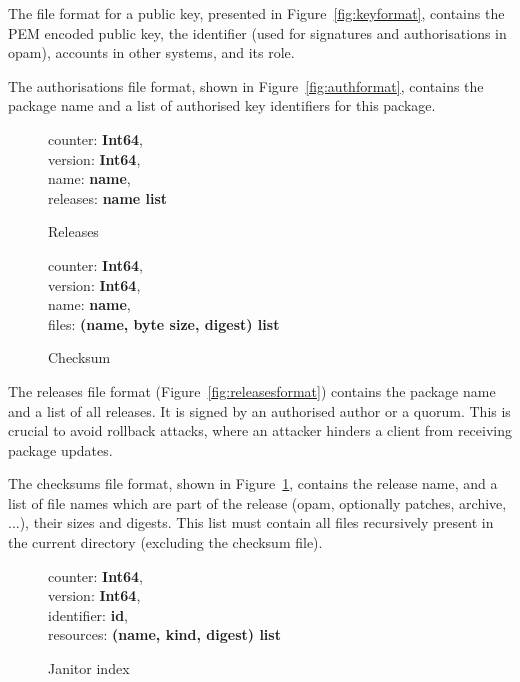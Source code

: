 \documentclass[nocopyrightspace]{sigplanconf}
\begin{document}
The file format for a public key, presented in Figure~\ref{fig:keyformat}, contains the PEM encoded public key, the identifier (used for signatures and authorisations in opam), accounts in other systems, and its role.

The authorisations file format, shown in Figure~\ref{fig:authformat}, contains the package name and a list of authorised key identifiers for this package.

\begin{figure}[h]
  \begin{minipage}{\hsize}
    \begin{minipage}{.3 \hsize}
counter: \textbf{Int64},\\
version: \textbf{Int64},\\
name: \textbf{name},\\
releases: \textbf{name list}
 \caption{\label{fig:releasesformat} Releases}
    \end{minipage}
    \hspace*{.5cm}
    \begin{minipage}{.55 \hsize}
counter: \textbf{Int64},\\
version: \textbf{Int64},\\
name: \textbf{name},\\
files: \textbf{(name, byte size, digest) list}
 \caption{\label{fig:checksumformat} Checksum}
    \end{minipage}
  \end{minipage}
\end{figure}

The releases file format (Figure~\ref{fig:releasesformat}) contains the package name and a list of all releases.
It is signed by an authorised author or a quorum.
This is crucial to avoid rollback attacks, where an attacker hinders a client from receiving package updates.

The checksums file format, shown in Figure~\ref{fig:checksumformat}, contains the release name, and a list of file names which are part of the release (opam, optionally patches, archive, ...), their sizes and digests.
This list must contain all files recursively present in the current directory (excluding the checksum file).

\begin{figure}[h]
counter: \textbf{Int64},\\
version: \textbf{Int64},\\
identifier: \textbf{id},\\
resources: \textbf{(name, kind, digest) list}
 \caption{\label{fig:janindexformat} Janitor index}
\end{figure}
\end{document}

